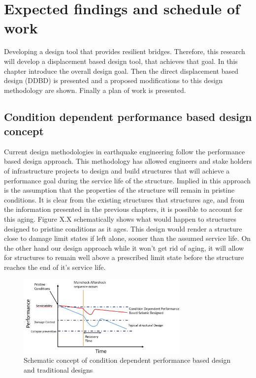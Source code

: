 \chapter{Expected findings and schedule of work}
Developing a design tool that provides resilient bridges. Therefore, this research will develop a displacement based design tool, that achieves that goal. In this chapter introduce the overall design goal. Then the direct displacement based design (DDBD) is presented and a proposed modifications to this design methodology are shown. Finally a plan of work is presented.

\section{Condition dependent performance based design concept}

Current design methodologies in earthquake engineering follow the performance based design approach. This methodology has allowed engineers and stake holders of infrastructure projects to design and build structures that will achieve a performance goal during the service life of the structure. Implied in this approach is the assumption that the properties of the structure will remain in pristine conditions. It is clear from the existing structures that structures age, and from the information presented in the previous chapters, it is possible to account for this aging. Figure X.X schematically shows what would happen to structures designed to pristine conditions as it ages. This design would render a structure close to damage limit states if left alone, sooner than the assumed service life. On the other hand our design approach while it won't get rid of aging, it will allow for structures to remain well above a prescribed limit state before the structure reaches the end of it's service life. 

\begin{figure}[htbp]
	\centering
	\includegraphics[width=0.75\textwidth]{VAC Prelim 2.0/Chapter-5/figs/CD_DDBD_Concept.png}
	\caption{Schematic concept of condition dependent performance based design and traditional designs}
	\label{fig:Concept_CD-DDBD}
\end{figure}

